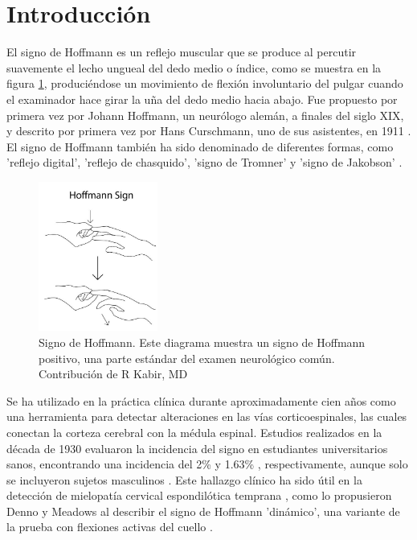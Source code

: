 \section{Introducción}
El signo de Hoffmann es un reflejo muscular que se produce al percutir suavemente el lecho ungueal del dedo medio o índice, como se muestra en la figura \ref{fig:Hoffmann_sign}, produciéndose un movimiento de flexión involuntario del pulgar cuando el examinador hace girar la uña del dedo medio hacia abajo. Fue propuesto por primera vez por Johann Hoffmann, un neurólogo alemán, a finales del siglo XIX, y descrito por primera vez por Hans Curschmann, uno de sus asistentes, en 1911 \cite{BENDHEIM}. El signo de Hoffmann también ha sido denominado de diferentes formas, como 'reflejo digital', 'reflejo de chasquido', 'signo de Tromner' y 'signo de Jakobson' \cite{glaser2001cervical}.

\begin{figure}[h!]
	\includegraphics[width=0.35\textwidth]{figures/Kabir_Hoffmann__Sign.jpg}
	\caption{Signo de Hoffmann. Este diagrama muestra un signo de Hoffmann positivo, una parte estándar del examen neurológico común. Contribución de R Kabir, MD}
	\label{fig:Hoffmann_sign}
\end{figure}

Se ha utilizado en la práctica clínica durante aproximadamente cien años como una herramienta para detectar alteraciones en las vías corticoespinales, las cuales conectan la corteza cerebral con la médula espinal. Estudios realizados en la década de 1930 evaluaron la incidencia del signo en estudiantes universitarios sanos, encontrando una incidencia del 2\% y 1.63\% \cite{echols1936hoffmann} \cite{fay1933clinical}, respectivamente, aunque solo se incluyeron sujetos masculinos \cite{glaser2001cervical}. Este hallazgo clínico ha sido útil en la detección de mielopatía cervical espondilótica temprana \cite{denno1991early}, como lo propusieron Denno y Meadows al describir el signo de Hoffmann 'dinámico', una variante de la prueba con flexiones activas del cuello \cite{glaser2001cervical}.

